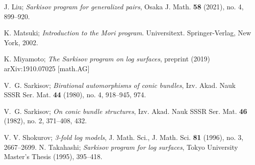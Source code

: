 \begin{thebibliography}{99}
  J. Liu;
  \textit{Sarkisov program for generalized pairs},
  Osaka J. Math. \textbf{58} (2021), no. 4, 899–920.

   K. Matsuki; \textit{Introduction to the Mori program}. Universitext. Springer-Verlag, New York, 2002.

  K. Miyamoto;
  \textit{The Sarkisov program on log surfaces},
  preprint (2019) arXiv:1910.07025 [math.AG]

  V.~G. Sarkisov;
  \textit{{Birational automorphisms of conic bundles}},
  Izv. Akad. Nauk SSSR Ser. Mat. \textbf{44} (1980), no. 4, 918–945, 974.

  V.~G. Sarkisov;
  \textit{On conic bundle structures},
  Izv. Akad. Nauk SSSR Ser. Mat. \textbf{46} (1982), no. 2, 371–408, 432.


  V. V. Shokurov;
  \textit{3-fold log models}, J. Math. Sci.,
  J. Math. Sci. \textbf{81} (1996), no. 3, 2667–2699.
  N. Takahashi;
  \textit{Sarkisov program for log surfaces},
  Tokyo University Master's Thesis (1995), 395--418.
\end{thebibliography}
